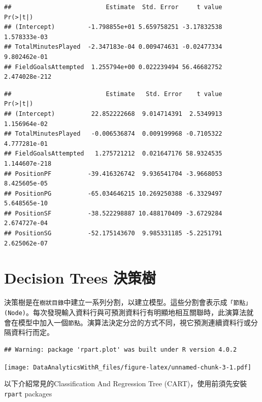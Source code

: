 \documentclass[
]{book}
\newenvironment{Shaded}{\begin{snugshade}}{\end{snugshade}}
\newcommand{\KeywordTok}[1]{\textcolor[rgb]{0.13,0.29,0.53}{\textbf{#1}}}
\newcommand{\NormalTok}[1]{#1}
\newcommand{\OperatorTok}[1]{\textcolor[rgb]{0.81,0.36,0.00}{\textbf{#1}}}
\begin{document}
\begin{verbatim}
##                          Estimate  Std. Error     t value      Pr(>|t|)
## (Intercept)         -1.798855e+01 5.659758251 -3.17832538  1.578333e-03
## TotalMinutesPlayed  -2.347183e-04 0.009474631 -0.02477334  9.802462e-01
## FieldGoalsAttempted  1.255794e+00 0.022239494 56.46682752 2.474028e-212
\end{verbatim}

\begin{Shaded}
\end{Shaded}

\begin{verbatim}
##                          Estimate   Std. Error    t value      Pr(>|t|)
## (Intercept)          22.852222668  9.014714391  2.5349913  1.156964e-02
## TotalMinutesPlayed   -0.006536874  0.009199968 -0.7105322  4.777281e-01
## FieldGoalsAttempted   1.275721212  0.021647176 58.9324535 1.144607e-218
## PositionPF          -39.416326742  9.936541704 -3.9668053  8.425605e-05
## PositionPG          -65.034646215 10.269250388 -6.3329497  5.648565e-10
## PositionSF          -38.522298887 10.488170409 -3.6729284  2.674727e-04
## PositionSG          -52.175143670  9.985331185 -5.2251791  2.625062e-07
\end{verbatim}

\hypertarget{decision-trees-ux6c7aux7b56ux6a39}{%
\section{Decision Trees 決策樹}\label{decision-trees-ux6c7aux7b56ux6a39}}

決策樹是在\texttt{樹狀目錄}中建立一系列分割，以建立模型。這些分割會表示成\texttt{「節點」(Node)}。每次發現輸入資料行與可預測資料行有明顯地相互關聯時，此演算法就會在模型中加入一個\texttt{節點}。演算法決定分岔的方式不同，視它預測連續資料行或分隔資料行而定。

\begin{verbatim}
## Warning: package 'rpart.plot' was built under R version 4.0.2
\end{verbatim}

\texttt{[image: DataAnalyticsWithR\_files/figure-latex/unnamed-chunk-3-1.pdf]}

以下介紹常見的Classification And Regression Tree (CART)，使用前須先安裝\texttt{rpart} packages \citep{R-rpart}
\end{document}
